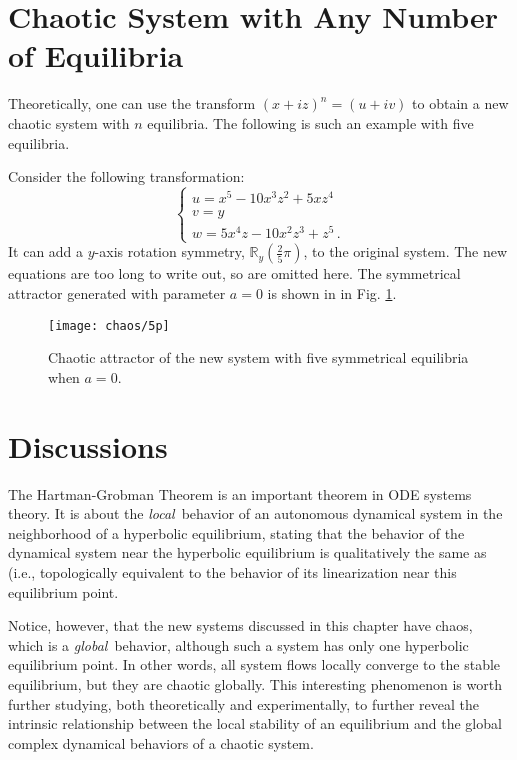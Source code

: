 \section{Chaotic System with Any Number of Equilibria}

Theoretically, one can use the transform $(x+iz)^{n}=(u+iv)$ to
obtain a new chaotic system with $n$ equilibria. The following is such an example with five equilibria.

Consider the following transformation:
\begin{equation}\label{tran5}
\left\{
\begin{array}{l}
u = x^5-10x^3z^2+5xz^4\\
v = y\\
w = 5x^4z-10x^2z^3+z^5\,.
\end{array}
\right.
\end{equation} %
It can add a $y$-axis rotation symmetry, $\mathbb{R}_{y}(\frac{2}{5}\pi)$, to the original system. The new equations are too long to write out, so are omitted here. The symmetrical attractor generated with parameter $a=0$ is shown in in Fig. \ref{5}.

\begin{figure}
\centering
\texttt{[image: chaos/5p]}
\caption{Chaotic attractor of the new system with five symmetrical equilibria when $a=0$.}\label{5}
\end{figure}

\section{Discussions}
The Hartman-Grobman Theorem is an important theorem in ODE systems theory. It is
about the \emph{local\,} behavior
of an autonomous dynamical system in the neighborhood of a hyperbolic
equilibrium,
stating that the behavior of the dynamical system near the hyperbolic
equilibrium is
qualitatively the same as (i.e., topologically equivalent to the behavior of its linearization near this equilibrium point.

Notice, however, that the new systems discussed in this chapter have chaos,
which is a \emph{global\,} behavior, although such a system
has only one hyperbolic equilibrium point. In other words, all system flows
locally converge
to the stable equilibrium, but they are chaotic globally. This interesting
phenomenon is
worth further studying, both theoretically and experimentally, to further reveal
the intrinsic relationship between the local stability of an equilibrium and the
global complex dynamical behaviors of a chaotic system.

